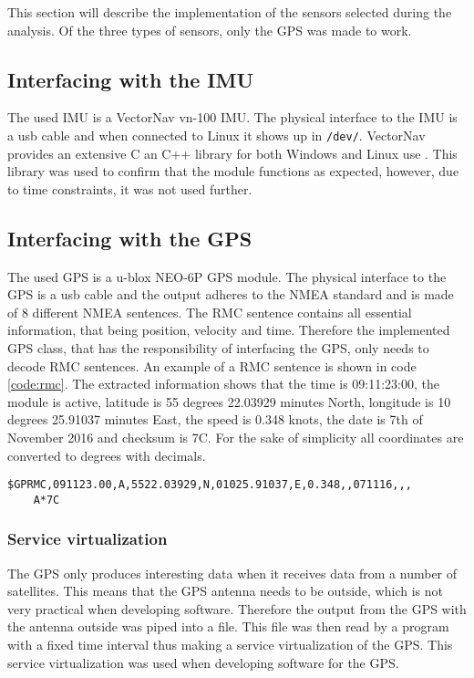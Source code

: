 \label{sub:implementation_of_sensors}
This section will describe the implementation of the sensors selected during the analysis.
Of the three types of sensors, only the GPS was made to work.



\subsection{Interfacing with the IMU}\label{sec:interface_IMU}
The used IMU is a VectorNav vn-100 IMU.
The physical interface to the IMU is a usb cable and when connected to Linux it shows up in \texttt{/dev/}.
VectorNav provides an extensive C an C++ library for both Windows and Linux use \cite{vectornav}. 
This library was used to confirm that the module functions as expected, however, due to time constraints, it was not used further.
\subsection{Interfacing with the GPS}\label{sec:interface_GPS}
The used GPS is a u-blox NEO-6P GPS module.
The physical interface to the GPS is a usb cable and the output adheres to the NMEA standard and is made of 8 different NMEA sentences.
The RMC sentence contains all essential information, that being position, velocity and time.
Therefore the implemented GPS class, that has the responsibility of interfacing the GPS, only needs to decode RMC sentences.
An example of a RMC sentence is shown in code \ref{code:rmc}.
The extracted information shows that the time is 09:11:23:00, the module is active, latitude is 55 degrees 22.03929 minutes North, longitude is 10 degrees 25.91037 minutes East, the speed is 0.348 knots, the date is  7th of November 2016 and checksum is 7C.
For the sake of simplicity all coordinates are converted to degrees with decimals. 
\begin{lstlisting}[caption=RMC sentence.,label=code:rmc]
$GPRMC,091123.00,A,5522.03929,N,01025.91037,E,0.348,,071116,,,
	A*7C
\end{lstlisting}

\subsubsection*{Service virtualization}
The GPS only produces interesting data when it receives data from a number of satellites. 
This means that the GPS antenna needs to be outside, which is not very practical when developing software.
Therefore the output from the GPS with the antenna outside was piped into a file.
This file was then read by a program with a fixed time interval thus making a service virtualization of the GPS.
This service virtualization was used when developing software for the GPS.